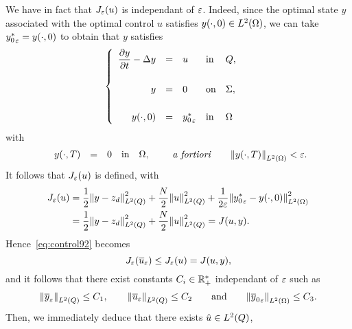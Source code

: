 We have in fact that $J_{\varepsilon}(u)$ is independant of $\varepsilon$. Indeed,
since the optimal state $y$ associated with the optimal control $u$
satisfies ${y}\!\left({\cdot, 0}\right)\in L^{2}\!\left({\Omega}\right)$, we can take
${y_{0}^{*}}_{\varepsilon} = {y}\!\left({\cdot, 0}\right)$ to obtain that $y$ satisfies
\begin{equation*}
    \begin{cases}\displaystyle
        \begin{array}{rclll}
            \dfrac{\partial{}y}{\partial{}t} - \Delta y & = & u & \text{in} & Q,\\
            \\
            y & = & 0 & \text{on} & \Sigma,\\
            \\
            {y}\!\left({\cdot, 0}\right) & = & {y_{0}^{*}}_{\varepsilon} & \text{in} &
            \Omega
        \end{array}
    \end{cases}
\end{equation*}
with
\begin{equation*}
    \begin{array}{rclll}
        {y}\!\left({\cdot,T}\right) & = & 0 & \text{in} & \Omega,
    \end{array}
    \qquad\text{\textit{a fortiori}}\qquad {\left\|{ {y}\!\left({\cdot,T}\right)  }\right\|}_{L^{2}\left({\Omega}\right)} <
    \varepsilon.
\end{equation*}
It follows that $J_{\varepsilon}(u)$ is defined, with
\begin{equation*}
    \begin{split}
        J_{\veps}(u) &= \dfrac{1}{2}\normecq{y - z_{d}} +
        \dfrac{N}{2}\normecq{u} + \dfrac{1}{2\veps}\normecohm{%
            {y_{0}^{*}}_{\veps} - \condinitiale{y}
        }\\
        & = \dfrac{1}{2}\normecq{y - z_{d}} + \dfrac{N}{2}\normecq{u} =
        J(u,y).
    \end{split}
\end{equation*}
Hence~\eqref{eq:control92} becomes
\begin{equation}\label{eq:control95}
    J_{\varepsilon}\!\left({{\overline{u}}_{\varepsilon}}\right) \leq J_{\varepsilon}(u) = J(u,y),
\end{equation}
and it follows that there exist constants $C_{i}\in{\mathbb{R}}_{+}^{*}$
independant of $\varepsilon$ such as
\begin{equation*}
    {\left\|{ {\overline{y}}_{\varepsilon}  }\right\|}_{L^{2}\left({Q}\right)} \leq C_{1},\qquad
    {\left\|{ {\overline{u}}_{\varepsilon}  }\right\|}_{L^{2}\left({Q}\right)}\leq C_{2}\qquad\text{and}\qquad
    {\left\|{{\overline{y}_{0}}_{\varepsilon} }\right\|}_{L^{2}\left({\Omega}\right)}\leq C_{3}.
\end{equation*}
Then, we immediately deduce that there exists $\hat{u}\in L^{2}\!\left({Q}\right)$,
